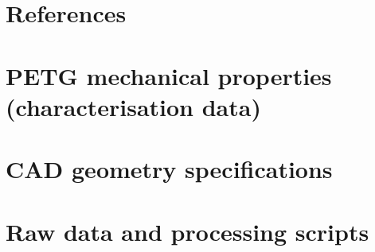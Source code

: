 \documentclass[11pt,a4paper]{article}
\theoremstyle{claim}
\begin{document}
\section*{References}
\printbibliography[heading=none]

\appendix

\section{PETG mechanical properties (characterisation data)}

\section{CAD geometry specifications}

\section{Raw data and processing scripts}
\end{document}
